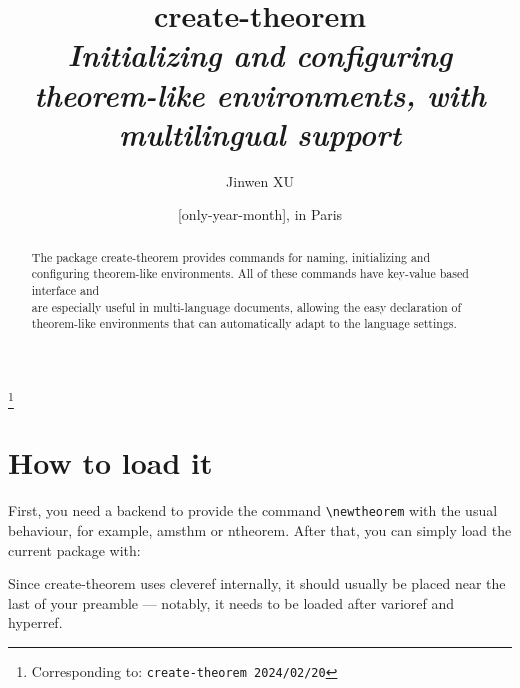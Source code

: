 \documentclass[classical]{einfart}
\newcommand{\meta}[1]{$\langle${\normalfont\itshape#1}$\rangle$}
\newenvironment{tip}[1][Tip]
  {%
    \LocallyStopLineNumbers%
    \begin{tcolorbox}[breakable,
        enhanced,
        width = \textwidth,
        colback = paper, colbacktitle = paper,
        colframe = gray!50, boxrule=0.2mm,
        coltitle = black,
        fonttitle = \sffamily,
        attach boxed title to top left = {yshift=-\tcboxedtitleheight/2, xshift=.5cm},
        boxed title style = {boxrule=0pt, colframe=paper},
        before skip = 3mm,
        after skip = 3mm,
        top = 2.5mm,
        bottom = 1.5mm,
        title={\scshape\sffamily #1}]%
  }
  {%
    \end{tcolorbox}%
    \ResumeLineNumbers%
  }
\newcommand{\createtheorempackage}{\textsf{create-theorem}}
\begin{document}
\def\PackageVersion{2024/02/20}
\def\PackageSubVersion{}

\title{\createtheorempackage{}\\\smallskip\itshape Initializing and configuring theorem-like environments, with multilingual support}
\author{Jinwen XU}
\thanks{Corresponding to: \texttt{\createtheorempackage{} \PackageVersion\PackageSubVersion}}
\date{\TheDate{\PackageVersion}[only-year-month], in Paris}

\maketitle

\begin{abstract}
    \raggedleft
    The package \createtheorempackage{} provides commands for naming, initializing and configuring theorem-like environments. All of these commands have key-value based interface and \\are especially useful in multi-language documents, allowing the easy declaration of \\theorem-like environments that can automatically adapt to the language settings.
\end{abstract}

\vspace{-.5\baselineskip}



\section{How to load it}

First, you need a backend to provide the command \lstinline|\newtheorem| with the usual behaviour, for example, \textsf{amsthm} or \textsf{ntheorem}. After that, you can simply load the current package with:

\begin{code}
\usepackage[(*\meta{options}*)]{create-theorem}
\end{code}

\begin{tip}[Attention]
    Since \createtheorempackage{} uses \textsf{cleveref} internally, it should usually be placed near the last of your preamble --- notably, it needs to be loaded after \textsf{varioref} and \textsf{hyperref}.
\end{tip}
\end{document}
